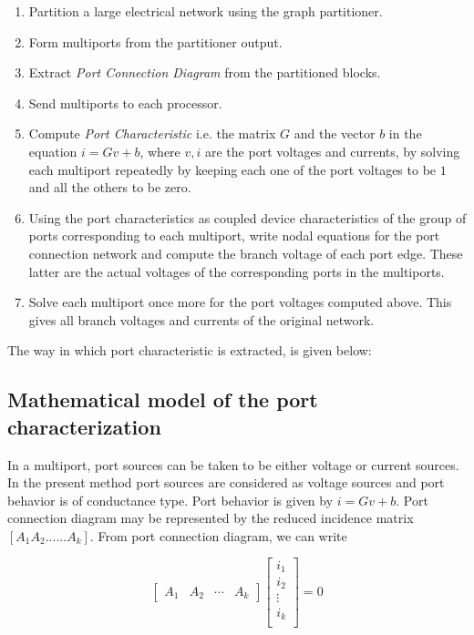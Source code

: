 \documentclass[12pt,psfig,a4]{article}
\begin{document}
\begin{enumerate}
\item Partition a large electrical network using the graph partitioner. 
\item Form multiports from the partitioner output.
\item Extract {\it Port Connection Diagram} from the partitioned blocks.
\item Send multiports to each processor.
\item Compute {\it Port Characteristic} i.e. the matrix $G$ and the vector $b$ in the equation
$i=Gv+b$,  where $v,i$ are the port voltages and currents, by solving each multiport repeatedly by keeping each one of the port
voltages to be $1$ and all the others to be zero.
\item Using the port characteristics as coupled device characteristics of
the group of ports corresponding to each multiport, write nodal equations for 
the port connection network 
and compute the branch voltage of each port edge.
These latter are the actual voltages of the corresponding ports in the 
multiports. 
\item Solve each multiport once more for the port voltages
computed above. This gives all branch voltages and currents of the original
network.
\end{enumerate}
The way in which port characteristic \cite{GAK,NJB,GT} is extracted, is given below: 
\subsection{Mathematical model of the port characterization}

In a multiport, port sources can be taken to be either voltage or current sources. In the present method port sources are
considered as voltage sources and port behavior is of conductance type. Port behavior is given by
$i=Gv+b$. Port connection diagram may be represented by the reduced incidence matrix 
$[A_{1} A_{2} ...... A_{k}]$. From port connection diagram, we can write

\begin{equation}
\left[\begin{array}{llll}
A_{1} & A_{2} & {\cdots} & A_{k}
\end{array}\right]
\left[\begin{array}{l}
i_{1}\\
i_{2}\\ 
{\vdots}\\
i_{k}\\
\end{array}\right]
= 0
\label{algo1}
\end{equation}
\end{document}
